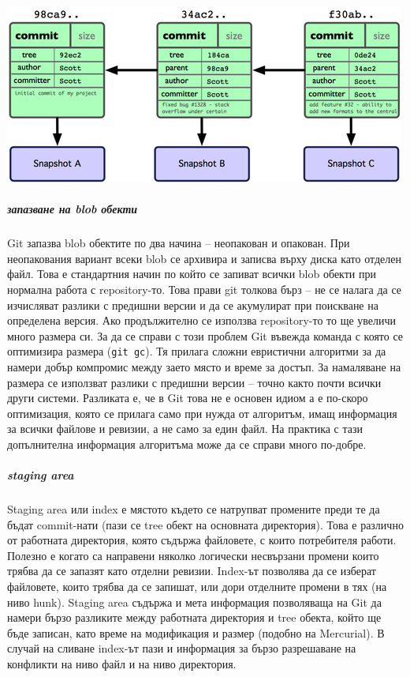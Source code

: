 \documentclass[a4paper]{article}
\begin{document}
      \vspace{8 mm}
      \begin{center}
        \includegraphics[scale=1.0]{git_commits.png}
      \end{center}

      \subparagraph{запазване на blob обекти} Git запазва blob обектите по два
      начина -- неопакован и опакован. При неопакования вариант всеки blob се
      архивира и записва върху диска като отделен файл. Това е стандартния
      начин по който се запиват всички blob обекти при нормална работа
      с repository-то. Това прави git толкова бърз -- не се налага да се
      изчисляват разлики с предишни версии и да се акумулират при поискване на
      определена версия. Ако продължително се използва repository-то то ще
      увеличи много размера си. За да се справи с този проблем Git въвежда
      команда с която се оптимизира размера (\texttt{git gc}). Тя прилага
      сложни евристични алгоритми за да намери добър компромис между заето
      място и време за достъп. За намаляване на размера се използват разлики
      с предишни версии -- точно както почти всички други системи. Разликата е,
      че в Git това не е основен идиом а е по-скоро оптимизация, която се
      прилага само при нужда от алгоритъм, имащ информация за всички файлове
      и ревизии, а не само за един файл. На практика с тази допълнителна
      информация алгоритъма може да се справи много по-добре.

      \subparagraph{staging area} Staging area или index е мястото където се
      натрупват промените преди те да бъдат commit-нати (пази се tree обект на
      основната директория). Това е различно от работната директория, която
      съдържа файловете, с които потребителя работи. Полезно е когато са
      направени няколко логически несвързани промени които трябва да се запазят
      като отделни ревизии. Index-ът позволява да се изберат файловете, които
      трябва да се запишат, или дори отделните промени в тях (на ниво hunk).
      Staging area съдържа и мета информация позволяваща на Git да намери бързо
      разликите между работната директория и tree обекта, който ще бъде
      записан, като време на модификация и размер (подобно на Mercurial).
      В случай на сливане index-ът пази и информация за бързо разрешаване на
      конфликти на ниво файл и на ниво директория.
\end{document}
